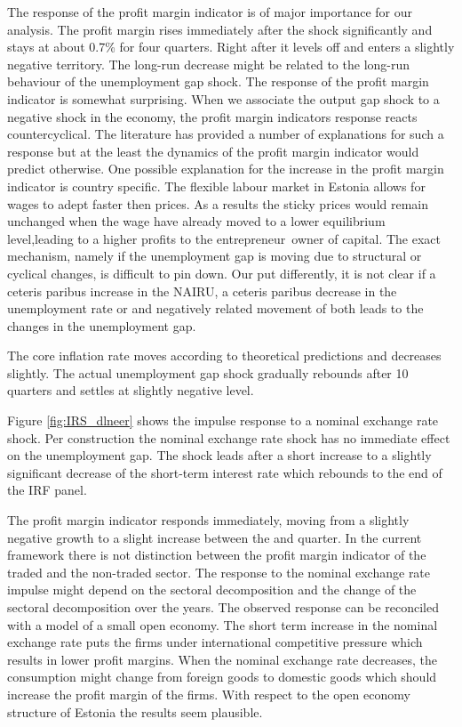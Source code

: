 \documentclass[twoside]{article}
\begin{document}
\begin{multicols}{2}
The response of the profit margin indicator is of major importance for our analysis. The profit margin rises immediately after the shock significantly and stays at about 0.7\% for four quarters. Right after it levels off and enters a slightly negative territory. The long-run decrease might be related to the long-run behaviour of the unemployment gap shock. The response of the profit margin indicator is somewhat surprising. When we associate the output gap shock to a negative shock in the economy, the profit margin indicators response reacts countercyclical. The literature has provided a number of explanations for such a response but at the least the dynamics of the profit margin indicator would predict otherwise. One possible explanation for the increase in the profit margin indicator is country specific. The flexible labour market in Estonia allows for wages to adept faster then prices. As a results the sticky prices would remain unchanged when the wage have already moved to a lower equilibrium level,leading to a higher profits to the entrepreneur\ owner of capital. The exact mechanism, namely if the unemployment gap is moving due to structural or cyclical changes,  is difficult to pin down. Our put differently,  it is not clear if a ceteris paribus increase in the NAIRU, a ceteris paribus decrease in the unemployment rate or and negatively related movement of both leads to the changes in the unemployment gap. 


The core inflation rate moves according to theoretical predictions and decreases slightly. The actual unemployment gap shock gradually rebounds after 10 quarters and settles at slightly negative level.

 Figure \ref{fig:IRS_dlneer} shows the impulse response to a nominal exchange rate shock. Per construction the nominal exchange rate shock has no immediate effect on the unemployment gap. The shock leads after a short increase to a slightly significant decrease of the short-term interest rate which rebounds to the end of the IRF panel. 

 The profit margin indicator responds immediately, moving from a slightly negative growth to a slight increase between the  and  quarter. In the current framework there is not distinction between the profit margin indicator of the traded and the non-traded sector. The response to the nominal exchange rate impulse might depend on the sectoral decomposition and the change of the sectoral decomposition over the years. The observed response can be reconciled with a model of a small open economy. The short term increase in the nominal exchange rate puts the firms under international competitive pressure which results in lower profit margins. When the nominal exchange rate decreases, the consumption might change from foreign goods to domestic goods which should increase the profit margin of the firms. With respect to the open  economy structure of Estonia the results seem plausible. 


\end{multicols}
\end{document}
